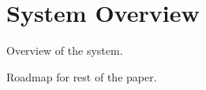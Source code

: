 \section{System Overview}
\label{sec:overview}

Overview of the system.

Roadmap for rest of the paper.